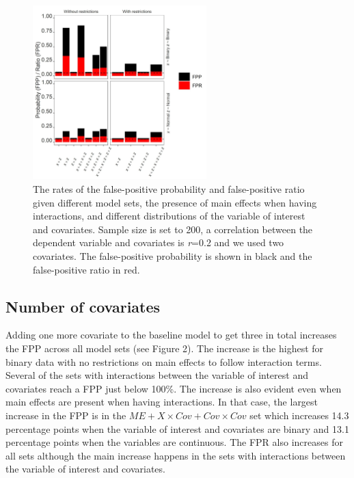 \begin{figure}[hbt!]
\includegraphics[width=0.6\textwidth]{R/Analysis/Result/Figures/Figure1A.jpeg}
\centering
\caption{The rates of the false-positive probability and false-positive ratio given different model sets, the presence of main effects when having interactions, and different distributions of the variable of interest and covariates. Sample size is set to 200, a correlation between the dependent variable and covariates is \textit{r}=0.2 and we used two covariates. The false-positive probability is shown in black and the false-positive ratio in red.}
\label{fig:mainfigure}
\end{figure}

\subsection{Number of covariates}
Adding one more covariate to the baseline model to get three in total increases the FPP across all model sets (see Figure 2). The increase is the highest for binary data with no restrictions on main effects to follow interaction terms. Several of the sets with interactions between the variable of interest and covariates reach a FPP just below 100\%. The increase is also evident even when main effects are present when having interactions. In that case, the largest increase in the FPP is in the $ME + X \times Cov + Cov \times Cov$ set which increases 14.3 percentage points when the variable of interest and covariates are binary and 13.1 percentage points when the variables are continuous. The FPR also increases for all sets although the main increase happens in the sets with interactions between the variable of interest and covariates. 

